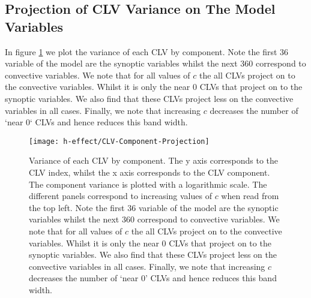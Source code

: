 \subsection{Projection of CLV Variance on The Model Variables}

In figure \ref{fig:h-effect-projection} we plot the variance of each CLV by component. Note the first $36$ variable of the model are the synoptic variables whilst the next $360$ correspond to convective variables. We note that for all values of $c$ the all CLVs project on to the convective variables. Whilst it is only the near $0$ CLVs that project on to the synoptic variables. We also find that these CLVs project less on the convective variables in all cases. Finally, we note that increasing $c$ decreases the number of `near $0$` CLVs and hence reduces this band width.

\begin{figure}
\centering
\texttt{[image: h-effect/CLV-Component-Projection]}
\caption{Variance of each CLV by component. The y axis corresponds to the CLV index, whilst the x axis corresponds to the CLV component. The component variance is plotted with a logarithmic scale. The different panels correspond to increasing values of $c$ when read from the top left. Note the first $36$ variable of the model are the synoptic variables whilst the next $360$ correspond to convective variables. We note that for all values of $c$ the all CLVs project on to the convective variables. Whilst it is only the near $0$ CLVs that project on to the synoptic variables. We also find that these CLVs project less on the convective variables in all cases. Finally, we note that increasing $c$ decreases the number of `near $0$' CLVs and hence reduces this band width.}
\label{fig:h-effect-projection}
\end{figure}
